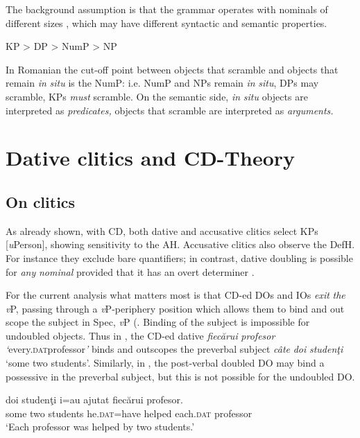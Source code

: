 \documentclass[output=paper,colorlinks,citecolor=brown,nonflat]{./langscibook}
\begin{document}
The background assumption is that the grammar operates with nominals of different sizes , which may have different syntactic and semantic properties. 

\ea%
      \label{ex:cornilescu:22}
        KP   >   DP   > NumP   > NP
      
      \z

             
In Romanian the cut-off point between objects that scramble and objects that remain \textit{in} \textit{situ} is the NumP: i.e. NumP and NPs remain \textit{in} \textit{situ}, DPs may scramble, KPs \textit{must} scramble. On the semantic side, \textit{in} \textit{situ} objects are interpreted as \textit{predicates,} objects that scramble are interpreted as \textit{arguments.}

\section{Dative clitics and CD-Theory} %

\subsection{{On} {clitics}}

As already shown, with CD, both dative and accusative clitics select KPs [\textit{u}Person], showing sensitivity to the AH. Accusative clitics also observe the DefH. For instance they exclude bare quantifiers; in contrast, dative doubling is possible for \textit{any} \textit{nominal} provided that it has an overt determiner \citep{Cornilescu2017}.

For the current analysis what matters most is that CD-ed DOs and IOs \textit{exit} \textit{the} \textit{v}P, passing through a \textit{v}P-periphery position which allows them to bind and out scope the subject in Spec, \textit{v}P (\citealt{Dobrovie-Sorin1994, CornilescuDinuTigău2017DOC,Tigau2010}. Binding of the subject is impossible for undoubled objects. Thus in , the CD-ed dative \textit{fiecărui} \textit{profesor} \textit{‘}every.\textsc{dat}professor\textit{’} binds and outscopes the preverbal subject \textit{câte} \textit{doi} \textit{studenţi} ‘some two students’. Similarly, in , the post-verbal doubled DO may bind a possessive in the preverbal subject, but this is not possible for the undoubled DO. 

\ea%
      \label{ex:cornilescu:27}
       {doi} {studenţi} {i=au}  {ajutat} {fiecărui} {profesor}.\\
            some two students he.\textsc{dat}=have helped each.\textsc{dat} professor\\
      \glt ‘Each professor was helped by two students.’
      \z
\end{document}
